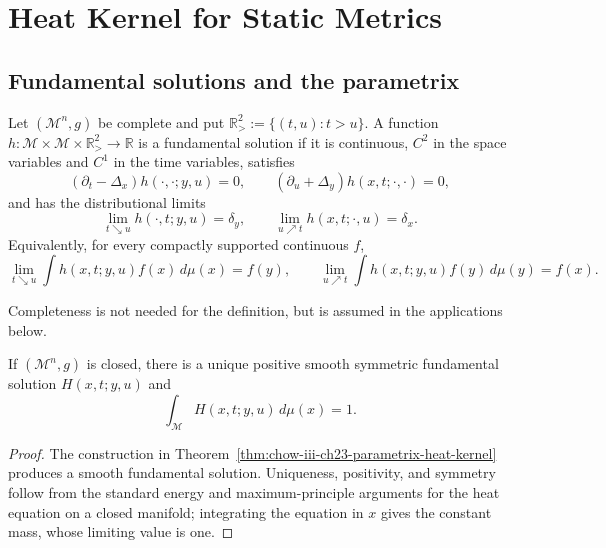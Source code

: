 \chapter[23]{Heat Kernel for Static Metrics}
\label{chow-iii-ch23-heat-kernel-static-metrics}

\section{Fundamental solutions and the parametrix}

\begin{definition}
\label{def:chow-iii-ch23-fundamental-solution}
Let $(\mathcal M^n,g)$ be complete and put
\(\mathbb R^2_>:=\{(t,u):t>u\}\).  A function
\(h:\mathcal M\times\mathcal M\times\mathbb R^2_>\to\mathbb R\) is a
fundamental solution if it is continuous, $C^2$ in the space variables and
$C^1$ in the time variables, satisfies
\[
(\partial_t-\Delta_x)h(\cdot,\cdot;y,u)=0,
\qquad (\partial_u+\Delta_y)h(x,t;\cdot,\cdot)=0,
\]
and has the distributional limits
\[
\lim_{t\searrow u}h(\cdot,t;y,u)=\delta_y,
\qquad \lim_{u\nearrow t}h(x,t;\cdot,u)=\delta_x.
\]
Equivalently, for every compactly supported continuous $f$,
\[
\lim_{t\searrow u}\int h(x,t;y,u)f(x)\,d\mu(x)=f(y),\qquad
\lim_{u\nearrow t}\int h(x,t;y,u)f(y)\,d\mu(y)=f(x).
\]
\end{definition}

\begin{remark}[Completeness]
\label{rem:chow-iii-ch23-completeness}
Completeness is not needed for the definition, but is assumed in the
applications below.
\end{remark}

\begin{theorem}
\label{thm:chow-iii-ch23-closed-heat-kernel}
If $(\mathcal M^n,g)$ is closed, there is a unique positive smooth symmetric
fundamental solution $H(x,t;y,u)$ and
\[
\int_{\mathcal M}H(x,t;y,u)\,d\mu(x)=1.
\]
\end{theorem}
\begin{proof}
\sketch The construction in Theorem~\ref{thm:chow-iii-ch23-parametrix-heat-kernel}
produces a smooth fundamental solution.  Uniqueness, positivity, and symmetry
follow from the standard energy and maximum-principle arguments for the heat
equation on a closed manifold; integrating the equation in $x$ gives the
constant mass, whose limiting value is one.
\end{proof}

